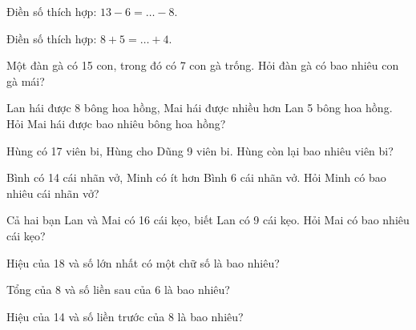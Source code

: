 \begin{ex}
Điền số thích hợp: $13 - 6 = \dots - 8$.
\end{ex}

\begin{ex}
Điền số thích hợp: $8 + 5 = \dots + 4$.
\end{ex}

\begin{ex}
Một đàn gà có 15 con, trong đó có 7 con gà trống. Hỏi đàn gà có bao nhiêu con gà mái?
\end{ex}

\begin{ex}
Lan hái được 8 bông hoa hồng, Mai hái được nhiều hơn Lan 5 bông hoa hồng. Hỏi Mai hái được bao nhiêu bông hoa hồng?
\end{ex}

\begin{ex}
Hùng có 17 viên bi, Hùng cho Dũng 9 viên bi. Hùng còn lại bao nhiêu viên bi?
\end{ex}

\begin{ex}
Bình có 14 cái nhãn vở, Minh có ít hơn Bình 6 cái nhãn vở. Hỏi Minh có bao nhiêu cái nhãn vở?
\end{ex}

\begin{ex}
Cả hai bạn Lan và Mai có 16 cái kẹo, biết Lan có 9 cái kẹo. Hỏi Mai có bao nhiêu cái kẹo?
\end{ex}

\begin{ex}
Hiệu của 18 và số lớn nhất có một chữ số là bao nhiêu?
\end{ex}

\begin{ex}
Tổng của 8 và số liền sau của 6 là bao nhiêu?
\end{ex}

\begin{ex}
Hiệu của 14 và số liền trước của 8 là bao nhiêu?
\end{ex}

